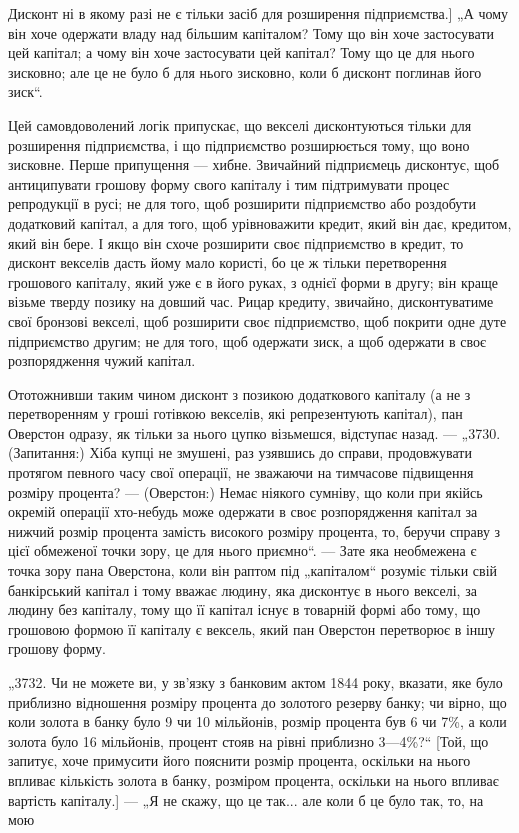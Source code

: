 Дисконт ні в якому разі не є тільки засіб для розширення підприємства.] „А чому він хоче одержати
владу над більшим капіталом? Тому що він хоче застосувати цей капітал; а чому він
хоче застосувати цей капітал? Тому що це для нього зисковно;
але це не було б для нього зисковно, коли б дисконт поглинав
його зиск“.

Цей самовдоволений логік припускає, що векселі дисконтуються тільки для розширення підприємства, і
що підприємство
розширюється тому, що воно зисковне. Перше припущення — хибне. Звичайний підприємець дисконтує, щоб
антиципувати грошову форму свого капіталу і тим підтримувати процес репродукції в русі; не для того,
щоб розширити підприємство або роздобути додатковий капітал, а для того, щоб урівноважити кредит,
який він дає, кредитом, який він бере. І якщо він схоче
розширити своє підприємство в кредит, то дисконт векселів
дасть йому мало користі, бо це ж тільки перетворення грошового капіталу, який уже є в його руках, з
однієї форми
в другу; він краще візьме тверду позику на довший час.
Рицар кредиту, звичайно, дисконтуватиме свої бронзові векселі,
щоб розширити своє підприємство, щоб покрити одне дуте підприємство другим; не для того, щоб
одержати зиск, а щоб одержати в своє розпорядження чужий капітал.

Ототожнивши таким чином дисконт з позикою додаткового
капіталу (а не з перетворенням у гроші готівкою векселів, які
репрезентують капітал), пан Оверстон одразу, як тільки за нього
цупко візьмешся, відступає назад. — „3730. (Запитання:) Хіба
купці не змушені, раз узявшись до справи, продовжувати протягом певного часу свої операції, не
зважаючи на тимчасове
підвищення розміру процента? — (Оверстон:) Немає ніякого
сумніву, що коли при якійсь окремій операції хто-небудь може
одержати в своє розпорядження капітал за нижчий розмір
процента замість високого розміру процента, то, беручи справу
з цієї обмеженої точки зору, це для нього приємно“. — Зате
яка необмежена є точка зору пана Оверстона, коли він раптом
під „капіталом“ розуміє тільки свій банкірський капітал і тому
вважає людину, яка дисконтує в нього векселі, за людину без
капіталу, тому що її капітал існує в товарній формі або тому,
що грошовою формою її капіталу є вексель, який пан Оверстон
перетворює в іншу грошову форму.

„3732. Чи не можете ви, у зв’язку з банковим актом 1844 року,
вказати, яке було приблизно відношення розміру процента до
золотого резерву банку; чи вірно, що коли золота в банку було
9 чи 10 мільйонів, розмір процента був 6 чи 7\%, а коли золота
було 16 мільйонів, процент стояв на рівні приблизно 3—4\%?“
[Той, що запитує, хоче примусити його пояснити розмір процента, оскільки на нього впливає кількість
золота в банку, розміром процента, оскільки на нього впливає вартість капіталу.] —
„Я не скажу, що це так... але коли б це було так, то, на мою
